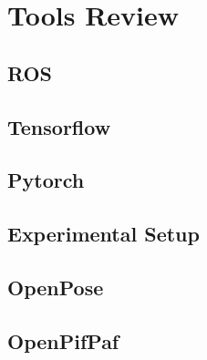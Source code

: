\chapter{Tools Review}
\label{chapter:tools_review}

\section{ROS}

\section{Tensorflow}

\section{Pytorch}

\section{Experimental Setup}

\section{OpenPose}

\section{OpenPifPaf}